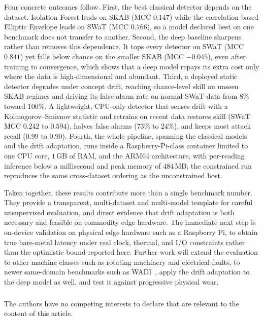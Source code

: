 \documentclass[runningheads]{llncs}
\begin{document}
Four concrete outcomes follow. First, the best classical detector depends on the
dataset. Isolation Forest leads on SKAB (MCC $0.147$) while the correlation-based
Elliptic Envelope leads on SWaT (MCC $0.766$), so a model declared best on one
benchmark does not transfer to another. Second, the deep baseline sharpens rather
than removes this dependence. It tops every detector on SWaT (MCC $0.841$) yet
falls below chance on the smaller SKAB (MCC $-0.045$), even after training to
convergence, which shows that a deep model repays its extra cost only where the
data is high-dimensional and abundant. Third, a deployed static detector degrades
under concept drift, reaching chance-level skill on unseen SKAB regimes and
driving its false-alarm rate on normal SWaT data from $8\%$ toward $100\%$. A
lightweight, CPU-only detector that senses drift with a Kolmogorov--Smirnov
statistic and retrains on recent data restores skill (SWaT MCC $0.242$ to
$0.594$), halves false alarms ($73\%$ to $24\%$), and keeps most attack recall
($0.99$ to $0.90$). Fourth, the whole pipeline, spanning the classical models and
the drift adaptation, runs inside a Raspberry-Pi-class container limited to one
CPU core, $1$\,GB of RAM, and the ARM64 architecture, with per-reading inference
below a millisecond and peak memory of $484$\,MB; the constrained run reproduces
the same cross-dataset ordering as the unconstrained host.

Taken together, these results contribute more than a single benchmark number.
They provide a transparent, multi-dataset and multi-model template for careful
unsupervised evaluation, and direct evidence that drift adaptation is both
necessary and feasible on commodity edge hardware. The immediate next step is
on-device validation on physical edge hardware such as a Raspberry Pi, to obtain
true bare-metal latency under real clock, thermal, and I/O constraints rather
than the optimistic bound reported here. Further work will extend the evaluation
to other machine classes such as rotating machinery and electrical faults, to
newer same-domain benchmarks such as WADI~\cite{ahmed2017}, apply the drift
adaptation to the deep model as well, and test it against progressive
physical wear.

\begin{credits}
\subsubsection{\discintname}
The authors have no competing interests to declare that are relevant to the
content of this article.
\end{credits}
\end{document}
